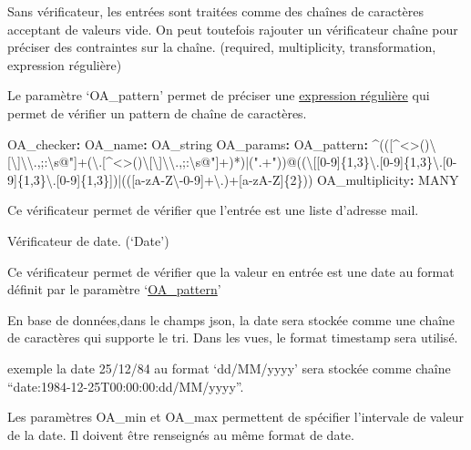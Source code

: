 \documentclass[
  letterpaper,
  DIV=11,
  numbers=noendperiod]{scrartcl}
\newenvironment{Shaded}{\begin{snugshade}}{\end{snugshade}}
\newcommand{\AttributeTok}[1]{\textcolor[rgb]{0.40,0.45,0.13}{#1}}
\newcommand{\FunctionTok}[1]{\textcolor[rgb]{0.28,0.35,0.67}{#1}}
\newcommand{\KeywordTok}[1]{\textcolor[rgb]{0.00,0.23,0.31}{\textbf{#1}}}
\begin{document}
Sans vérificateur, les entrées sont traitées comme des chaînes de
caractères acceptant de valeurs vide. On peut toutefois rajouter un
vérificateur chaîne pour préciser des contraintes sur la chaîne.
(required, multiplicity, transformation, expression régulière)

Le paramètre `OA\_pattern' permet de préciser une
\href{https://blog.paumard.org/cours/java-api/chap03-expression-regulieres-syntaxe.html}{expression
régulière} qui permet de vérifier un pattern de chaîne de caractères.

\begin{Shaded}
\begin{Highlighting}[]
\AttributeTok{    }\FunctionTok{OA\_checker}\KeywordTok{:}
\AttributeTok{        }\FunctionTok{OA\_name}\KeywordTok{:}\AttributeTok{ OA\_string}
\AttributeTok{        }\FunctionTok{OA\_params}\KeywordTok{:}\AttributeTok{ }
\AttributeTok{            }\FunctionTok{OA\_pattern}\KeywordTok{:}\AttributeTok{ \^{}(([\^{}\textless{}\textgreater{}()\textbackslash{}[\textbackslash{}]\textbackslash{}\textbackslash{}.,;:\textbackslash{}s@"]+(\textbackslash{}.[\^{}\textless{}\textgreater{}()\textbackslash{}[\textbackslash{}]\textbackslash{}\textbackslash{}.,;:\textbackslash{}s@"]+)*)|(".+"))@((\textbackslash{}[[0{-}9]\{1,3\}\textbackslash{}.[0{-}9]\{1,3\}\textbackslash{}.[0{-}9]\{1,3\}\textbackslash{}.[0{-}9]\{1,3\}])|(([a{-}zA{-}Z\textbackslash{}{-}0{-}9]+\textbackslash{}.)+[a{-}zA{-}Z]\{2\}))}
\AttributeTok{            }\FunctionTok{OA\_multiplicity}\KeywordTok{:}\AttributeTok{ MANY}
\end{Highlighting}
\end{Shaded}

Ce vérificateur permet de vérifier que l'entrée est une liste d'adresse
mail.

Vérificateur de date. (`Date')

Ce vérificateur permet de vérifier que la valeur en entrée est une date
au format définit par le paramètre
`\href{https://docs.oracle.com/javase/8/docs/api/java/time/format/DateTimeFormatter.html}{OA\_pattern}'

En base de données,dans le champs json, la date sera stockée comme une
chaîne de caractères qui supporte le tri. Dans les vues, le format
timestamp sera utilisé.

exemple la date 25/12/84 au format `dd/MM/yyyy' sera stockée comme
chaîne ``date:1984-12-25T00:00:00:dd/MM/yyyy''.

Les paramètres OA\_min et OA\_max permettent de spécifier l'intervale de
valeur de la date. Il doivent être renseignés au même format de date.
\end{document}

